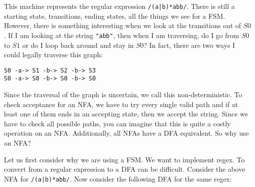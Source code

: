 \documentclass[main.tex]{subfiles}
\begin{document}
This machine represents the regular expression \texttt{/(a|b)*abb/}. There is still a starting state, transitions, ending states, all the things we see for a FSM. However, there is something interesting when we look at the transitions out of $S0$. If I am looking at the string \texttt{"abb"}, then when I am traversing, do I go from $S0$ to $S1$ or do I loop back around and stay in $S0$? In fact, there are two ways I could legally traverse this graph: 
\begin{center}
    \texttt{S0 -a-> S1 -b-> S2 -b-> S3}\\
    \texttt{S0 -a-> S0 -b-> S0 -b-> S0}
\end{center}

Since the traversal of the graph is uncertain, we call this non-deterministic. To check acceptance for an NFA, we have to try every single valid path and if at least one of them ends in an accepting state, then we accept the string. Since we have to check all possible paths, you can imagine that this is quite a costly operation on an NFA. Additionally, all NFAs have a DFA equivalent. So why use an NFA?

Let us first consider why we are using a FSM. We want to implement regex. To convert from a regular expression to a DFA can be difficult. Consider the above NFA for \texttt{/(a|b)*abb/}. Now consider the following DFA for the same regex:

\begin{center}
\end{center}
\end{document}
